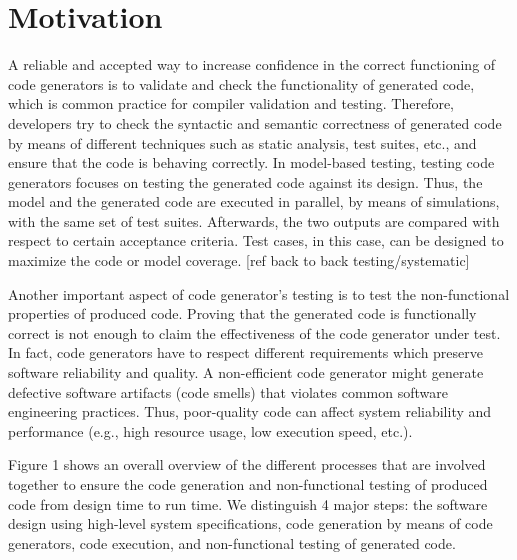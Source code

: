 \section{Motivation}

A reliable and accepted way to increase confidence in the correct functioning of code generators is to validate and check the functionality of generated code, which is common practice for compiler validation and testing.
Therefore, developers try to check the syntactic and semantic correctness of generated code by means of different techniques such as static analysis, test suites, etc., and ensure that the code is behaving correctly. 
In model-based testing, testing code generators focuses on testing the generated code against its design. Thus, the model and the generated code are executed in parallel, by means of simulations, with the same set of test suites. Afterwards, the two outputs are compared with respect to certain acceptance criteria. Test cases, in this case, can be designed to maximize the code or model coverage. [ref back to back testing/systematic]


Another important aspect of code generator's testing is to test the non-functional properties of produced code. Proving that the generated code is functionally correct is not enough to claim the effectiveness of the code generator under test. 
In fact, code generators have to respect different requirements which preserve software reliability and quality. A non-efficient code generator might generate defective software artifacts (code smells) that violates common software engineering practices. Thus, poor-quality code can affect system reliability and performance (e.g., high resource usage, low execution speed, etc.).


Figure 1 shows an overall overview of the different processes that are involved together to ensure the code generation and non-functional testing of produced code from design time to run time. We distinguish 4 major steps: the software design using high-level system specifications, code generation by means of code generators, code execution, and non-functional testing of generated code. 

